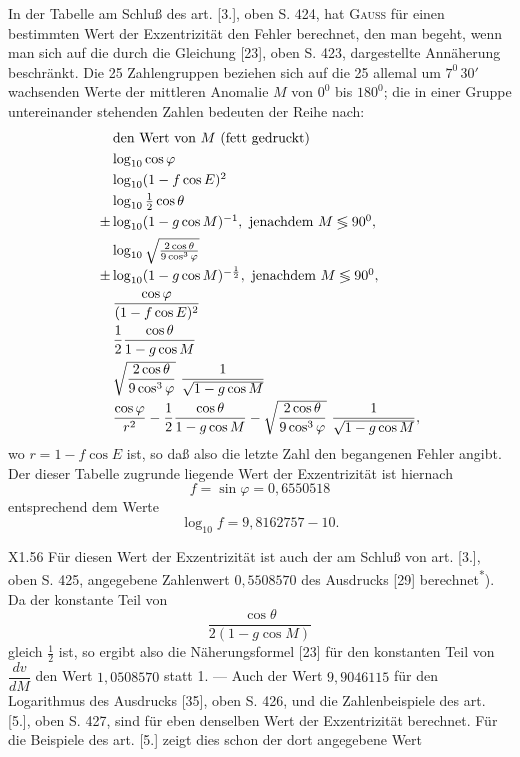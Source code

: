 \indent In der Tabelle am Schluß des art. [3.], oben S. 424, hat \textsc{Gauss} für einen bestimmten Wert der Exzentrizität den Fehler berechnet, den man begeht, wenn man sich auf die durch die Gleichung [23], oben S. 423, dargestellte Annäherung beschränkt. Die 25 Zahlengruppen beziehen sich auf die 25 allemal um \(7^0\,30'\) wachsenden Werte der mittleren Anomalie \(M\) von \(0^0\) bis \(180^0\); die in einer Gruppe untereinander stehenden Zahlen bedeuten der Reihe nach:
\[
\begin{array}{r@{\,}l}
&\text{den Wert von }M\text{ (fett gedruckt)}\\[3pt]
&\log_{10}\cos\varphi\\[3pt]
&\log_{10}(1-f\cos E)^2\\[3pt]
&\log_{10}\frac12\cos\theta\\[3pt]
\pm&\log_{10}(1-g\cos M)^{-1},\ \text{jenachdem }M\lessgtr90^0,\\[5pt]
&\log_{10}\sqrt{\frac{2\cos\theta}{9\cos^3\varphi}}\\[5pt]
\pm&\log_{10}(1-g\cos M)^{-\frac12},\ \text{jenachdem }M\lessgtr90^0,\\[5pt]
&\dfrac{\cos\varphi}{(1-f\cos E)^2}\\[9pt]
&\dfrac12\dfrac{\cos\theta}{1-g\cos M}\\[9pt]
&\sqrt{\dfrac{2\cos\theta}{9\cos^3\varphi}}\ \dfrac1{\sqrt{1-g\cos M}}\\[9pt]
&\dfrac{\cos\varphi}{r^2}-\dfrac12\dfrac{\cos\theta}{1-g\cos M}-\sqrt{\dfrac{2\cos\theta}{9\cos^3\varphi}}\ \dfrac1{\sqrt{1-g\cos M}},
\end{array}
\]
\noindent wo \(r=1-f\cos E\) ist, so daß also die letzte Zahl den begangenen Fehler angibt. Der dieser Tabelle zugrunde liegende Wert der Exzentrizität ist hiernach
\[f=\sin\varphi=0{,}6550518\]
\noindent entsprechend dem Werte
\begin{equation}\tag*{($\ast$)}\log_{10}f=9{,}8162757-10.\end{equation}
\par\smallskip\noindent X1.\hfill 56
\clearpage{}
\noindent Für diesen Wert der Exzentrizität ist auch der am Schluß von art. [3.], oben S. 425, angegebene Zahlenwert \(0{,}5508570\) des Ausdrucks [29] berechnet\textsuperscript{*}). Da der konstante Teil von
\[\frac{\cos\theta}{2(1-g\cos M)}\]
\noindent gleich \(\tfrac12\) ist, so ergibt also die Näherungsformel [23] für den konstanten Teil von \(\dfrac{dv}{dM}\) den Wert \(1{,}0508570\) statt 1. — Auch der Wert \(9{,}9046115\) für den Logarithmus des Ausdrucks [35], oben S. 426, und die Zahlenbeispiele des art. [5.], oben S. 427, sind für eben denselben Wert der Exzentrizität berechnet. Für die Beispiele des art. [5.] zeigt dies schon der dort angegebene Wert
